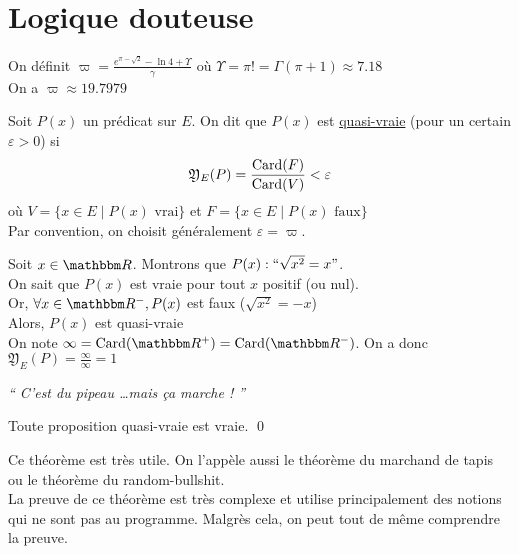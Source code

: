 \part{Logique douteuse}

\newcommand{\ww}{\mathfrak{Y}}

\begin{defn}
	On définit $\varpi = \frac{e^{\pi - \sqrt{2}} - \ln 4 + \Upsilon}{\gamma}$ où $\Upsilon = \pi! = \Gamma(\pi+1) \approx 7.18$\\
	On a $\varpi \approx 19.7979$
\end{defn}

\begin{defn}
	Soit $P(x)$ un prédicat sur $E$.
	On dit que $P(x)$ est \underline{quasi-vraie} (pour un certain $\varepsilon > 0$) si \[
		 \ww_E(P) = \frac{\Card(F)}{\Card(V)}<\varepsilon
	\] où $V = \{x \in E  \mid P(x) \text{ vrai}\} $
	et $F = \{x \in E  \mid P(x) \text{ faux}\} $\\
	Par convention, on choisit généralement $\varepsilon = \varpi$.
\end{defn}

\begin{exm}
	Soit $x \in \R$.
	Montrons que $P(x): ``\sqrt{x^2} = x"$.\\
	On sait que $P(x)$ est vraie pour tout $x$ positif (ou nul).\\
	Or, $\forall x \in \R^-, P(x)$ est faux ($\sqrt{x^2} = -x$)\\
	Alors, $P(x)$ est quasi-vraie\\
	On note $\infty = \Card(\R^+) = \Card(\R^-)$. On a donc $\ww_E(P) = \frac{\infty}{\infty} = 1$
\end{exm}

\begin{thm}
	\begin{center}
		\itshape `` C'est du pipeau \ldots mais ça marche ! ''
	\end{center}
	Toute proposition quasi-vraie est vraie. \qed
\end{thm}

\begin{rmk}
	Ce théorème est très utile. On l'appèle aussi le théorème du marchand de tapis ou le théorème du random-bullshit.\\
	La preuve de ce théorème est très complexe et utilise principalement des notions qui ne sont pas au programme. Malgrès cela, on peut tout de même comprendre la preuve.
\end{rmk}


